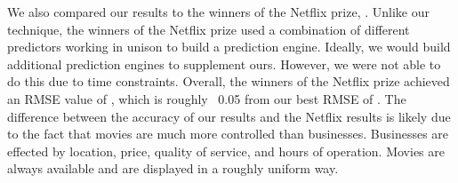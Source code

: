 We also compared our results to the winners of the Netflix prize, \cite{netprize}. Unlike our technique, the winners of the Netflix prize used a combination of different predictors working in unison to build a prediction engine. Ideally, we would build additional prediction engines to supplement ours. However, we were not able to do this due to time constraints. Overall, the winners of the Netflix prize achieved an RMSE value of \bestNetflixRMSE, which is roughly ~0.05 from our best RMSE of \bestRMSE. The difference between the accuracy of our results and the Netflix results is likely due to the fact that movies are much more controlled than businesses. Businesses are effected by location, price, quality of service, and hours of operation. Movies are always available and are displayed in a roughly uniform way. 

